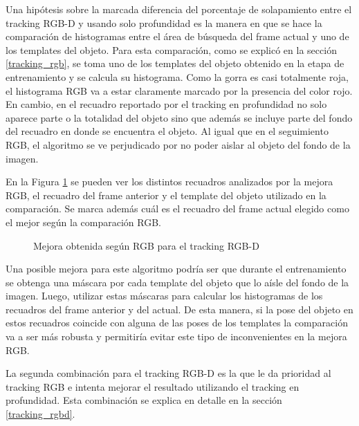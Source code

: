Una hipótesis sobre la marcada diferencia del porcentaje de solapamiento entre el tracking RGB-D y usando solo profundidad es la manera en que se hace la comparación de histogramas entre el área de búsqueda del frame actual y uno de los templates del objeto.  Para esta comparación, como se explicó en la sección \ref{tracking_rgb}, se toma uno de los templates del objeto obtenido en la etapa de entrenamiento y se calcula su histograma. Como la gorra es casi totalmente roja, el histograma RGB va a estar claramente marcado por la presencia del color rojo. En cambio, en el recuadro reportado por el tracking en profundidad no solo aparece parte o la totalidad del objeto sino que además se incluye parte del fondo del recuadro en donde se encuentra el objeto. Al igual que en el seguimiento RGB, el algoritmo se ve perjudicado por no poder aislar al objeto del fondo de la imagen.

En la Figura \ref{mejora_rgb_en_tracking_rgbd} se pueden ver los distintos recuadros analizados por la mejora RGB, el recuadro del frame anterior y el template del objeto utilizado en la comparación. Se marca además cuál es el recuadro del frame actual elegido como el mejor según la comparación RGB.

\begin{figure}
	\caption{Mejora obtenida según RGB para el tracking RGB-D}
	\label{mejora_rgb_en_tracking_rgbd}
\end{figure}

Una posible mejora para este algoritmo podría ser que durante el entrenamiento se obtenga una máscara por cada template del objeto que lo aísle del fondo de la imagen. Luego, utilizar estas máscaras para calcular los histogramas de los recuadros del frame anterior y del actual. De esta manera, si la pose del objeto en estos recuadros coincide con alguna de las poses de los templates la comparación va a ser más robusta y permitiría evitar este tipo de inconvenientes en la mejora RGB.

La segunda combinación para el tracking RGB-D es la que le da prioridad al tracking RGB e intenta mejorar el resultado utilizando el tracking en profundidad. Esta combinación se explica en detalle en la sección \ref{tracking_rgbd}.


